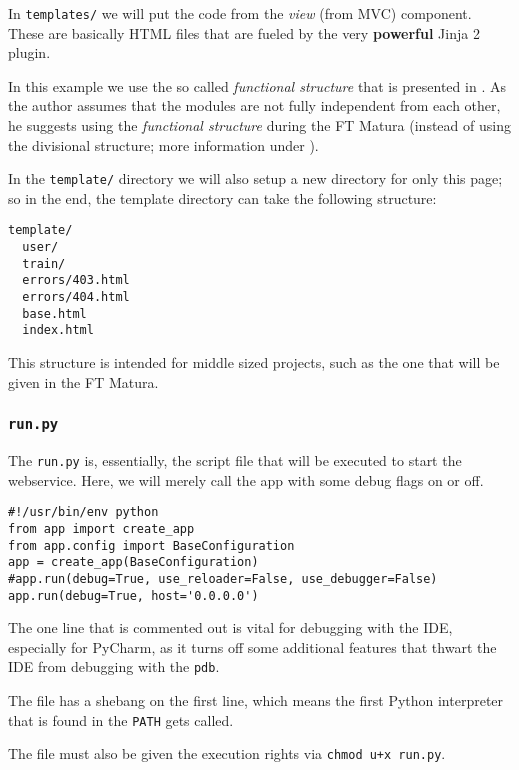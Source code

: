 \documentclass[../main/main.tex]{subfiles}
\begin{document}
In \lstinline|templates/| we will put the code from the \textit{view}
(from MVC) component. These are basically HTML files that are fueled by
the very \textbf{powerful} Jinja 2 plugin.

In this example we use the so called \textit{functional structure} that
is presented in \cite{exploreflask:functional}. As the author assumes
that the modules are not fully independent from each other, he suggests
using the \textit{functional structure} during the FT Matura (instead of
using the divisional structure; more information under
\cite{exploreflask:functional}). 

In the \lstinline|template/| directory we will also setup a new directory for
only this page; so in the end, the template directory can take the following
structure: 

\begin{lstlisting}
template/
  user/
  train/
  errors/403.html
  errors/404.html
  base.html
  index.html
\end{lstlisting}

This structure is intended for middle sized projects, such as the one that will
be given in the FT Matura. 

\subsubsection{\lstinline|run.py|}

The \lstinline|run.py| is, essentially, the script file that will be executed to
start the webservice. Here, we will merely call the app with some debug flags
on or off. 

\begin{lstlisting}[caption=run.py, label=lst:run.py]
#!/usr/bin/env python
from app import create_app
from app.config import BaseConfiguration
app = create_app(BaseConfiguration)
#app.run(debug=True, use_reloader=False, use_debugger=False)
app.run(debug=True, host='0.0.0.0')
\end{lstlisting}

The one line that is commented out is vital for debugging with the
IDE, especially for PyCharm, as it turns off some additional features
that thwart the IDE from debugging with the \lstinline|pdb|. 

The file has a shebang on the first line, which means the first Python
interpreter that is found in the \lstinline|PATH| gets called. 

The file must also be given the execution rights via \lstinline|chmod u+x run.py|. 
\end{document}
